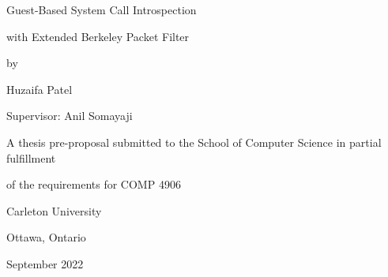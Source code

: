 \documentclass{article}
\begin{document}

\centerline{\Huge Guest-Based System Call Introspection}
\vspace{3mm}
\centerline{\Huge with Extended Berkeley Packet Filter}
\vspace{14mm}
\centerline{\large by}
\vspace{10mm}
\centerline{\large Huzaifa Patel}
\vspace{2mm}
\centerline{\large Supervisor: Anil Somayaji}
\vspace{3cm}
\centerline{\large A thesis pre-proposal submitted to the School of Computer Science in partial fulfillment}
\vspace{2mm}
\centerline{\large of the requirements for COMP 4906}
\vspace{4cm}
\centerline{\large Carleton University}
\vspace{3mm}
\centerline{\large Ottawa, Ontario}
\vspace{3mm}
\centerline{\large September 2022}



\end{document}
